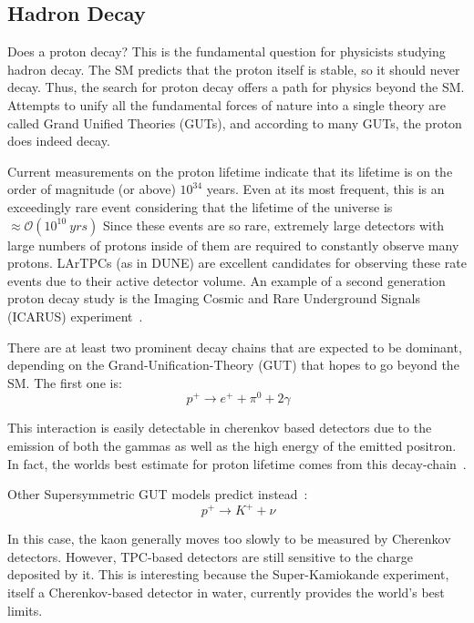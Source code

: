 \subsection{Hadron Decay}
\label{sec:hadron_decay}
Does a proton decay?
This is the fundamental question for physicists studying hadron decay.
The SM predicts that the proton itself is stable, so it should never decay.
Thus, the search for proton decay offers a path for physics beyond the SM.
Attempts to unify all the fundamental forces of nature into a single theory are called Grand Unified Theories (GUTs), and according to many GUTs, the proton does indeed decay.

Current measurements on the proton lifetime indicate that its lifetime is on the order of magnitude (or above) $10^{34}$ years.
Even at its most frequent, this is an exceedingly rare event considering that the lifetime of the universe is $\approx \mathcal{O}(10^{10}~\unit{yrs})$
Since these events are so rare, extremely large detectors with large numbers of protons inside of them are required to constantly observe many protons.
LArTPCs (as in DUNE) are excellent candidates for observing these rate events due to their active detector volume.
An example of a second generation proton decay study is the Imaging Cosmic and Rare Underground Signals (ICARUS) experiment~\citep{ICARUS_2001}.

There are at least two prominent decay chains that are expected to be dominant, depending on the Grand-Unification-Theory (GUT) that hopes to go beyond the SM.
The first one is:
\begin{equation}~\label{eq:rxn_proton_decay1}
  p^{+} \rightarrow e^{+} + \pi^{0} + 2 \gamma
\end{equation}


This interaction is easily detectable in cherenkov based detectors due to the emission of both the gammas as well as the high energy of the emitted positron.
In fact, the worlds best estimate for proton lifetime comes from this decay-chain~\citep{PhysRevD.95.012004}.

Other Supersymmetric GUT models predict instead~\citep{PhysRevD.38.1479}:
\begin{equation}~\label{eq:rxn_proton_decay2}
  p^{+} \rightarrow K^{+} + \nu
\end{equation}

In this case, the kaon generally moves too slowly to be measured by Cherenkov detectors.
However, TPC-based detectors are still sensitive to the charge deposited by it.
This is interesting because the Super-Kamiokande experiment, itself a Cherenkov-based detector in water, currently provides the world's best limits.

